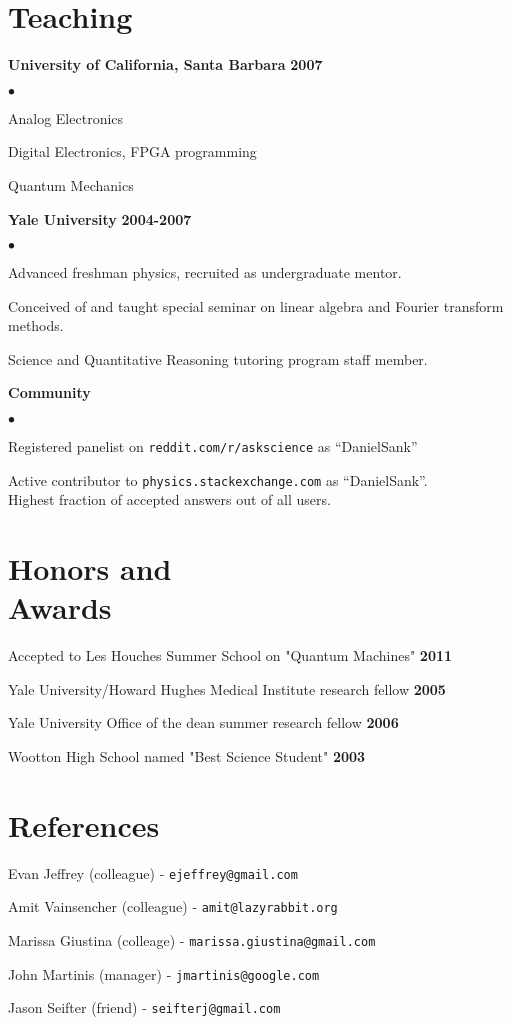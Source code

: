 \documentclass[margin=2cm,line]{res}
\newenvironment{list3}{
  \begin{list}{}{%
      \setlength{\itemsep}{0in}
      \setlength{\parsep}{0in} \setlength{\parskip}{0in}
      \setlength{\topsep}{0in} \setlength{\partopsep}{0in}
      \setlength{\leftmargin}{0.2in}}}{\end{list}}
\newenvironment{list4}{
  \begin{list}{$\bullet$}{%
      \setlength{\itemsep}{0in}
      \setlength{\parsep}{0in} \setlength{\parskip}{0in}
      \setlength{\topsep}{0in} \setlength{\partopsep}{0in}
      \setlength{\leftmargin}{0.2in}}}{\end{list}}
\begin{document}
\begin{resume}
\section{\sc Teaching}
{\bf University of California, Santa Barbara} \hfill{\bf 2007}
\begin{list4}
\item Analog Electronics
\item Digital Electronics, FPGA programming
\item Quantum Mechanics
\end{list4}
{\bf Yale University} \hfill{\bf 2004-2007}
\begin{list4}
\item Advanced freshman physics, recruited as undergraduate mentor.
\item Conceived of and taught special seminar on linear algebra and Fourier transform methods.
\item Science and Quantitative Reasoning tutoring program staff member.
\end{list4}

{\bf Community}
\begin{list4}
\item Registered panelist on \texttt{reddit.com/r/askscience} as ``DanielSank''
\item Active contributor to \texttt{physics.stackexchange.com} as ``DanielSank''.\\
Highest fraction of accepted answers out of all users.
\end{list4}


\section{\sc Honors and\\ Awards}
\begin{list3}
\item Accepted to Les Houches Summer School on "Quantum Machines" \hfill {\bf 2011}
\item Yale University/Howard Hughes Medical Institute research fellow \hfill {\bf 2005}
\item Yale University Office of the dean summer research fellow \hfill {\bf 2006}
\item Wootton High School named "Best Science Student" \hfill {\bf 2003}
\end{list3}

\section{\sc References}
\begin{list3}
\item Evan Jeffrey (colleague) - \texttt{ejeffrey@gmail.com}
\item Amit Vainsencher (colleague) - \texttt{amit@lazyrabbit.org}
\item Marissa Giustina (colleage) - \texttt{marissa.giustina@gmail.com}
\item John Martinis (manager) - \texttt{jmartinis@google.com}
\item Jason Seifter (friend) - \texttt{seifterj@gmail.com}
\end{list3}


\end{resume}
\end{document}
